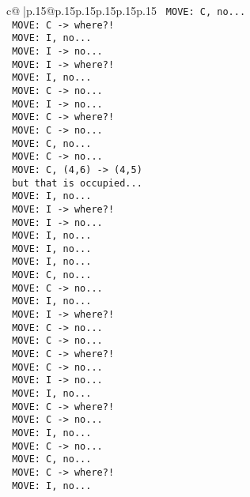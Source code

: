 \documentclass{article}
\begin{document}
{\begin{supertabular}{c@{$\;$}|p{.15\linewidth}@{}p{.15\linewidth}p{.15\linewidth}p{.15\linewidth}p{.15\linewidth}p{.15\linewidth}}
{{{\texttt{ MOVE: C, no...} \\
\texttt{ MOVE: C {-}> where?!} \\
\texttt{ MOVE: I, no...} \\
\texttt{ MOVE: I {-}> no...} \\
\texttt{ MOVE: I {-}> where?!} \\
\texttt{ MOVE: I, no...} \\
\texttt{ MOVE: C {-}> no...} \\
\texttt{ MOVE: I {-}> no...} \\
\texttt{ MOVE: C {-}> where?!} \\
\texttt{ MOVE: C {-}> no...} \\
\texttt{ MOVE: C, no...} \\
\texttt{ MOVE: C {-}> no...} \\
\texttt{ MOVE: C, (4,6) {-}> (4,5) } \\
\texttt{ but that is occupied...} \\
\texttt{ MOVE: I, no...} \\
\texttt{ MOVE: I {-}> where?!} \\
\texttt{ MOVE: I {-}> no...} \\
\texttt{ MOVE: I, no...} \\
\texttt{ MOVE: I, no...} \\
\texttt{ MOVE: I, no...} \\
\texttt{ MOVE: C, no...} \\
\texttt{ MOVE: C {-}> no...} \\
\texttt{ MOVE: I, no...} \\
\texttt{ MOVE: I {-}> where?!} \\
\texttt{ MOVE: C {-}> no...} \\
\texttt{ MOVE: C {-}> no...} \\
\texttt{ MOVE: C {-}> where?!} \\
\texttt{ MOVE: C {-}> no...} \\
\texttt{ MOVE: I {-}> no...} \\
\texttt{ MOVE: I, no...} \\
\texttt{ MOVE: C {-}> where?!} \\
\texttt{ MOVE: C {-}> no...} \\
\texttt{ MOVE: I, no...} \\
\texttt{ MOVE: C {-}> no...} \\
\texttt{ MOVE: C, no...} \\
\texttt{ MOVE: C {-}> where?!} \\
\texttt{ MOVE: I, no...} \\
}}}
\end{supertabular}}
\end{document}

